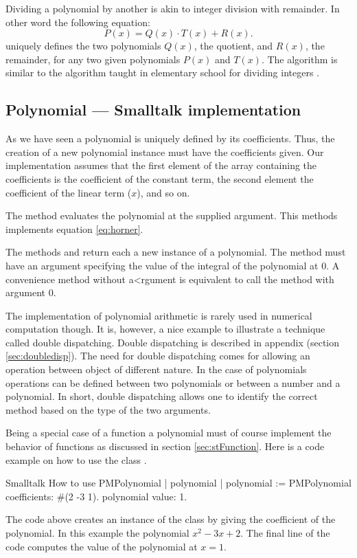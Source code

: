 Dividing a polynomial by another is akin to integer division with
remainder. In other word the following equation:
\begin{equation}
P\left(x\right)=Q\left(x\right)\cdot
T\left(x\right)+R\left(x\right).
\end{equation}
uniquely defines the two polynomials $Q\left(x\right)$, the
quotient, and $R\left(x\right)$, the remainder, for any two given
polynomials $P\left(x\right)$ and $T\left(x\right)$. The algorithm
is similar to the algorithm taught in elementary school for
dividing integers \cite{Knuth2}.

\subsection{Polynomial --- Smalltalk implementation}
As we have seen a polynomial is uniquely defined by its
coefficients. Thus, the creation of a new polynomial instance must
have the coefficients given. Our implementation assumes that the
first element of the array containing the coefficients is the
coefficient of the constant term, the second element the
coefficient of the linear term ($x$), and so on.

The method  evaluates the polynomial at the supplied
argument. This methods implements equation \ref{eq:horner}.

The methods  and  return each a new
instance of a polynomial. The method  must have an
argument specifying the value of the integral of the polynomial at
0. A convenience  method without a<rgument is
equivalent to call the method  with argument 0.

The implementation of polynomial arithmetic is rarely used in
numerical computation though. It is, however, a nice example to
illustrate a technique called double dispatching. Double
dispatching is described in appendix (\cf section
\ref{sec:doubledisp}). The need for double dispatching comes for
allowing an operation between object of different nature. In the
case of polynomials operations can be defined between two
polynomials or between a number and a polynomial. In short, double
dispatching allows one to identify the correct method based on the
type of the two arguments.

Being a special case of a function a polynomial must of course implement the behavior of
functions as discussed in section \ref{sec:stFunction}.
Here is a code example on how to use the class .
\begin{listing}{Smalltalk}
{How to use PMPolynomial}
| polynomial |
polynomial := PMPolynomial coefficients: #(2 -3 1).
polynomial value: 1.
\end{listing}
The code above creates an instance of the class  by giving the coefficient of the polynomial. In
this example the polynomial $x^2-3x+2$. The final line of the code
computes the value of the polynomial at $x=1$.

